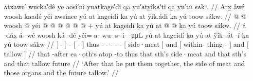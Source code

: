 \ex\label{ex:92-148-put-together-meat-organs-tallow}%
%
\begingl
	\glpreamble	ᴀtxawe′ wuckā′dê ye aosî′nî yuᴀtkagē′dî qa yu′ᴀtỵîkᴀ′tî qa yū′tū sᴀkᵘ. //
	\glpreamble	Atx̱ áwé woosh kaadé yéi awsinee yú at kageidí ḵa yú at ÿik.ádi ḵa yú toow sákw. //
	\gla	{}  @ {} {}  @ {}
		{} woosh  @ {} {}
		yéi @  @ {} @ {} @ {} @ {} @ {} +
		{} yú at kageidí {}
		ḵa {} yú at  @ {} @ {} {}
		ḵa {} yú toow sákw. {} //
	\glb	{} á -dáx̱ {} á -wé
		{} woosh ká -dé {}
		yéi= a- wu- s- i-  -μμL
		{} yú at kageidí {}
		ḵa {} yú at ÿík- át -í {}
		ḵa {} yú toow sákw {} //
	\glc	{}[  - {}]  -
		{}[   - {}]
		thus - - - -  -
		{}[   side·meat {}]
		and {}[   within- thing - {}]
		and {}[  tallow  {}] //
	\gld	{} that -after {}  {}
		{} ea·oth‘s atop -to {}
		thus  {} {} {} {} {}
		{} that sth’s side·meat {}
		and {} that sth’s  {} {} {}
		and {} that tallow future {} //
	\glft	‘After that he put them together, the side of meat and those organs and the future tallow.’
		//
\endgl
\xe

